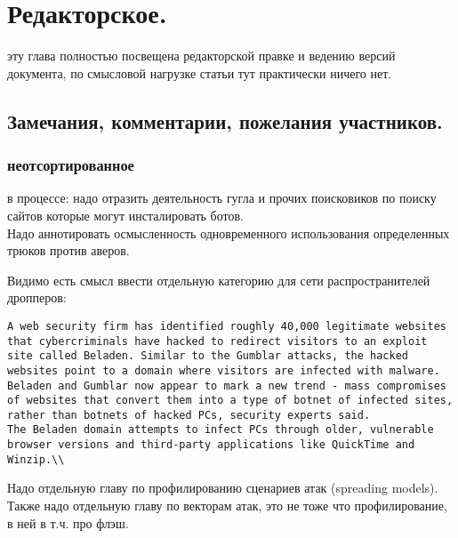 \section{Редакторское.}

\label{section_paper_workflow}

эту глава полностью посвещена редакторской правке и ведению версий документа, по смысловой нагрузке статьи тут практически ничего нет.

\subsection{Замечания, комментарии, пожелания участников.}

\subsubsection{неотсортированное}
в процессе: надо отразить деятельность гугла и прочих поисковиков по поиску сайтов которые могут инсталировать ботов.\\

Надо аннотировать осмысленность одновременного использования определенных трюков против аверов.

Видимо есть смысл ввести отдельную категорию для сети распространителей дропперов:
\begin{verbatim}
A web security firm has identified roughly 40,000 legitimate websites that cybercriminals have hacked to redirect visitors to an exploit site called Beladen. Similar to the Gumblar attacks, the hacked websites point to a domain where visitors are infected with malware.
Beladen and Gumblar now appear to mark a new trend - mass compromises of websites that convert them into a type of botnet of infected sites, rather than botnets of hacked PCs, security experts said.
The Beladen domain attempts to infect PCs through older, vulnerable browser versions and third-party applications like QuickTime and Winzip.\\
\end{verbatim}

Надо отдельную главу по профилированию сценариев атак (spreading models).\\

Также надо отдельную главу по векторам атак, это не тоже что профилирование, в ней в т.ч. про флэш.\\


